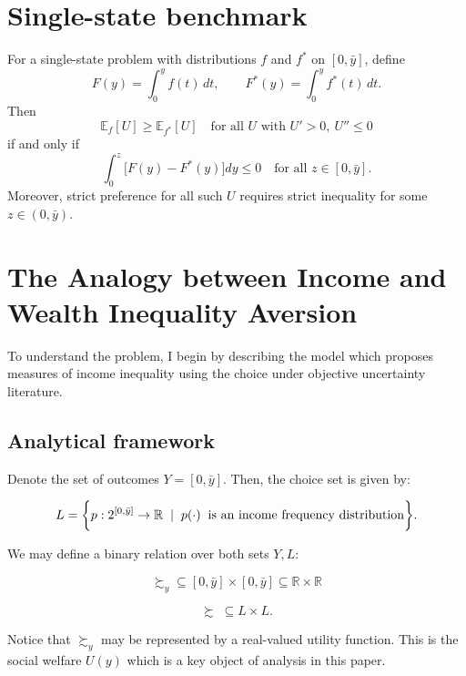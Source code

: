 \documentclass[../../../00-main.tex]{subfiles}
\begin{document}
\section{Single-state benchmark}

\begin{prop}
For a single-state problem with distributions $f$ and $f^*$ on $[0,\bar y]$, define
\[
F(y)=\int_0^y f(t)\,dt,
\qquad
F^*(y)=\int_0^y f^*(t)\,dt.
\]
Then
\[
\mathbb{E}_{f}[U] \ge \mathbb{E}_{f^*}[U]
\quad\text{for all } U\text{ with }U'>0,\ U''\le 0
\]
if and only if
\[
\int_0^z \big[F(y)-F^*(y)\big]dy \le 0
\quad\text{for all } z\in[0,\bar y].
\]
Moreover, strict preference for all such $U$ requires strict inequality for some $z\in(0,\bar y)$.
\end{prop}

\section{The Analogy between Income and Wealth Inequality Aversion}
\label{app:objective-benchmark}

\par To understand the problem, I begin by describing the model which proposes measures of income inequality using the choice under objective uncertainty literature. 

\subsection*{Analytical framework}

\par Denote the set of outcomes $Y = [0,\bar{y}]$. Then, the choice set is given by:

$$ L = \bigg\{ p: 2^{[0,\bar{y}]} \to \mathbb{R} \hspace{2mm} | \hspace{2mm} p(\cdot) \hspace{2mm} \text{is an income frequency distribution}  \bigg\}. $$

\par We may define a binary relation over both sets $Y,L:$

$$ \succsim_{y} \subseteq [0,\bar{y}] \times [0,\bar{y}] \subseteq \mathbb{R} \times \mathbb{R} $$

$$ \succsim \; \subseteq L \times L. $$

\par Notice that $\succsim_y$ may be represented by a real-valued utility function. This is the social welfare $U(y)$ which is a key object of analysis in this paper. 
\end{document}
